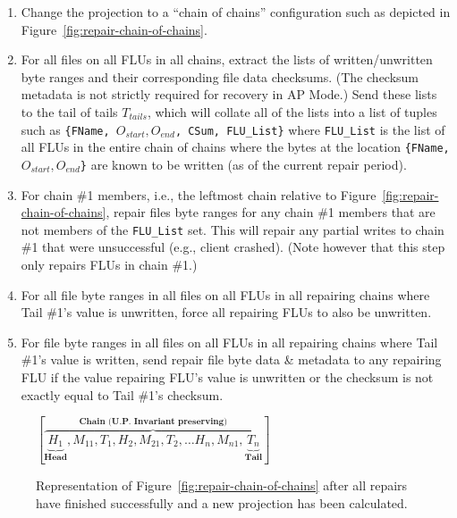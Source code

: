 \documentclass[preprint,10pt]{sigplanconf}
\begin{document}
\begin{enumerate}

\item Change the projection to a ``chain of chains'' configuration
  such as depicted in Figure~\ref{fig:repair-chain-of-chains}.

\item For all files on all FLUs in all chains, extract the lists of
  written/unwritten byte ranges and their corresponding file data
  checksums.  (The checksum metadata is not strictly required for
  recovery in AP Mode.)
  Send these lists to the tail of tails
  $T_{tails}$, which will collate all of the lists into a list of
  tuples such as {\tt \{FName, $O_{start}, O_{end}$, CSum, FLU\_List\}}
  where {\tt FLU\_List} is the list of all FLUs in the entire chain of
  chains where the bytes at the location {\tt \{FName, $O_{start},
    O_{end}$\}} are known to be written (as of the current repair period).

\item For chain \#1 members, i.e., the
  leftmost chain relative to Figure~\ref{fig:repair-chain-of-chains},
  repair files byte ranges for any chain \#1 members that are not members
  of the {\tt FLU\_List} set.  This will repair any partial
  writes to chain \#1 that were unsuccessful (e.g., client crashed).
  (Note however that this step only repairs FLUs in chain \#1.)

\item For all file byte ranges in all files on all FLUs in all
  repairing chains where Tail \#1's value is unwritten, force all
  repairing FLUs to also be unwritten.

\item For file byte ranges in all files on all FLUs in all repairing
  chains where Tail \#1's value is written, send repair file byte data
  \& metadata to any repairing FLU if the value repairing FLU's
  value is unwritten or the checksum is not exactly equal to Tail \#1's
  checksum.

\end{enumerate}

\begin{figure}
\centering
$
[\overbrace{\underbrace{H_1}_\textbf{Head}, M_{11}, T_1,
                        H_2, M_{21}, T_2,
                        \ldots
                        H_n, M_{n1},
                        \underbrace{T_n}_\textbf{Tail}}^\textbf{Chain (U.P.~Invariant preserving)}
]
$
\caption{Representation of Figure~\ref{fig:repair-chain-of-chains}
  after all repairs have finished successfully and a new projection has
  been calculated.}
\label{fig:repair-chain-of-chains-finished}
\end{figure}
\end{document}
